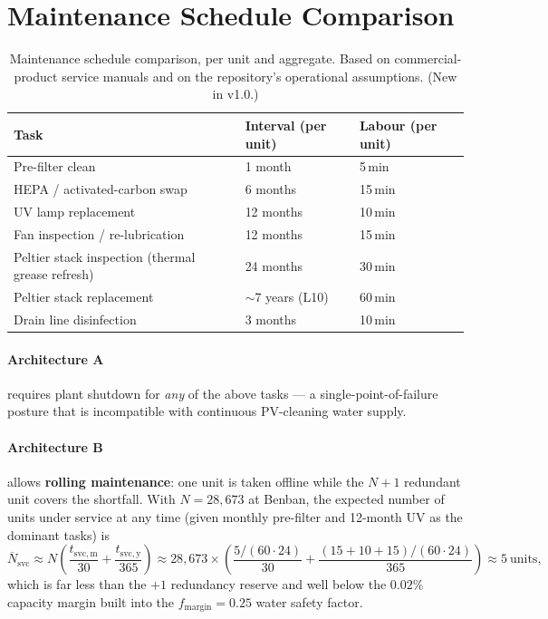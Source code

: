 \documentclass[11pt,a4paper]{article}
\begin{document}
\section{Maintenance Schedule Comparison}
\label{sec:maintenance}
\begin{table}[h]
\centering\small
\caption{Maintenance schedule comparison, per unit and aggregate. Based on commercial-product service manuals \citep{ecoloblue2024,peltier_handbook_2018} and on the repository's operational assumptions. (New in v1.0.)}
\label{tab:maintenance}
\begin{tabular}{@{}lll@{}}
\toprule
\textbf{Task} & \textbf{Interval (per unit)} & \textbf{Labour (per unit)} \\
\midrule
Pre-filter clean            & 1 month & 5\,min \\
HEPA / activated-carbon swap & 6 months & 15\,min \\
UV lamp replacement          & 12 months & 10\,min \\
Fan inspection / re-lubrication & 12 months & 15\,min \\
Peltier stack inspection (thermal grease refresh) & 24 months & 30\,min \\
Peltier stack replacement    & $\sim$7 years (L10) & 60\,min \\
Drain line disinfection      & 3 months & 10\,min \\
\bottomrule
\end{tabular}
\end{table}

\paragraph{Architecture A} requires plant shutdown for \emph{any} of the above tasks --- a single-point-of-failure posture that is incompatible with continuous PV-cleaning water supply.

\paragraph{Architecture B} allows \textbf{rolling maintenance}: one unit is taken offline while the $N{+}1$ redundant unit covers the shortfall. With $N{=}28{,}673$ at Benban, the expected number of units under service at any time (given monthly pre-filter and 12-month UV as the dominant tasks) is
\begin{equation}
\overline{N}_{\mathrm{svc}} \approx N\left(\frac{t_{\mathrm{svc,m}}}{30} + \frac{t_{\mathrm{svc,y}}}{365}\right)
\approx 28{,}673\times\left(\frac{5/(60\cdot 24)}{30}+\frac{(15{+}10{+}15)/(60\cdot 24)}{365}\right)
\approx 5\ \text{units},
\end{equation}
which is far less than the $+1$ redundancy reserve and well below the $0.02\%$ capacity margin built into the $f_{\mathrm{margin}}{=}0.25$ water safety factor.
\end{document}
